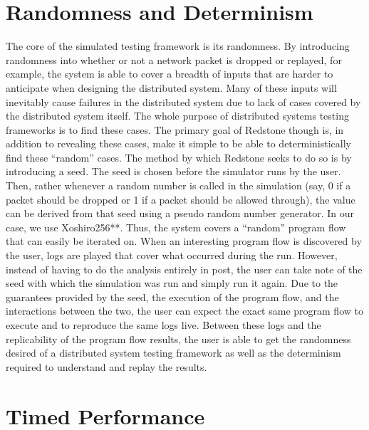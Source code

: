 \section{\txtrsdust Randomness and Determinism}

{\fontsize{12}{15}\selectfont 
The core of the simulated testing framework is its randomness. By introducing randomness into whether or not a network packet is dropped or replayed, for example, the system is able to cover a breadth of inputs that are harder to anticipate when designing the distributed system. Many of these inputs will inevitably cause failures in the distributed system due to lack of cases covered by the distributed system itself. The whole purpose of distributed systems testing frameworks is to find these cases. The primary goal of Redstone though is, in addition to revealing these cases, make it simple to be able to deterministically find these “random” cases. The method by which Redstone seeks to do so is by introducing a seed. The seed is chosen before the simulator runs by the user. Then, rather whenever a random number is called in the simulation (say, 0 if a packet should be dropped or 1 if a packet should be allowed through), the value can be derived from that seed using a pseudo random number generator. In our case, we use Xoshiro256**. Thus, the system covers a “random” program flow that can easily be iterated on. When an interesting program flow is discovered by the user, logs are played that cover what occurred during the run. However, instead of having to do the analysis entirely in post, the user can take note of the seed with which the simulation was run and simply run it again. Due to the guarantees provided by the seed, the execution of the program flow, and the interactions between the two, the user can expect the exact same program flow to execute and to reproduce the same logs live. Between these logs and the replicability of the program flow results, the user is able to get the randomness desired of a distributed system testing framework as well as the determinism required to understand and replay the results.

}

\section{\txtrsdust Timed Performance}

